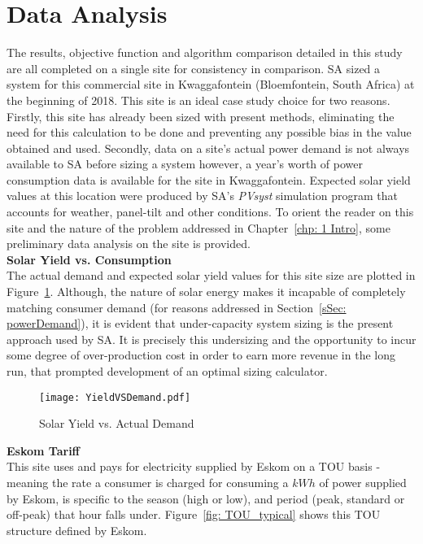 \documentclass[a4paper,11pt,fleqn]{report}
\begin{document}
\section{Data Analysis} \label{sec: Site Analysis}
The results, objective function and algorithm comparison detailed in this study are all completed on a single site for consistency in comparison. \ac{SA} sized a system for this commercial site in Kwaggafontein (Bloemfontein, South Africa) at the beginning of 2018. This site is an ideal case study choice for two reasons. Firstly, this site has already been sized with present methods, eliminating the need for this calculation to be done and preventing any possible bias in the value obtained and used. Secondly, data on a site's actual power demand is not always available to \ac{SA} before sizing a system however, a year's worth of power consumption data is available for the site in Kwaggafontein. Expected solar yield values at this location were produced by \ac{SA}'s \textit{PVsyst} simulation program that accounts for weather, panel-tilt and other conditions. To orient the reader on this site and the nature of the problem addressed in Chapter~\ref{chp: 1 Intro}, some preliminary data analysis on the site is provided.\\

\textbf{Solar Yield vs. Consumption}\\
The actual demand and expected solar yield values for this site size are plotted in Figure~\ref{fig: YieldVSDemand}. Although, the nature of solar energy makes it incapable of completely matching consumer demand (for reasons addressed in Section~\ref{sSec: powerDemand}), it is evident that under-capacity system sizing is the present approach used by \ac{SA}. It is precisely this undersizing and the opportunity to incur some degree of over-production cost in order to earn more revenue in the long run, that prompted development of an optimal sizing calculator. \\

\begin{figure}
\begin{center}
\texttt{[image: YieldVSDemand.pdf]}
\caption{Solar Yield vs. Actual Demand}
\label{fig: YieldVSDemand}
\end{center}
\end{figure}

\noindent\textbf{Eskom Tariff}\\
This site uses and pays for electricity supplied by Eskom on a \ac{TOU} basis - meaning the rate a consumer is charged for consuming a $kWh$ of power supplied by Eskom, is specific to the season (high or low), and period (peak, standard or off-peak) that hour falls under. Figure~\ref{fig: TOU_typical} shows this \ac{TOU} structure defined by Eskom.
\end{document}
